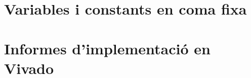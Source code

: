 \documentclass[a4paper,12pt]{article}
\begin{document}
\clearpage
\begin{appendices}
{


    \section{ Variables i constants en coma fixa } 
    

    \clearpage \section{ Informes d'implementació en Vivado } 
    


}
\end{appendices}


\end{document}
